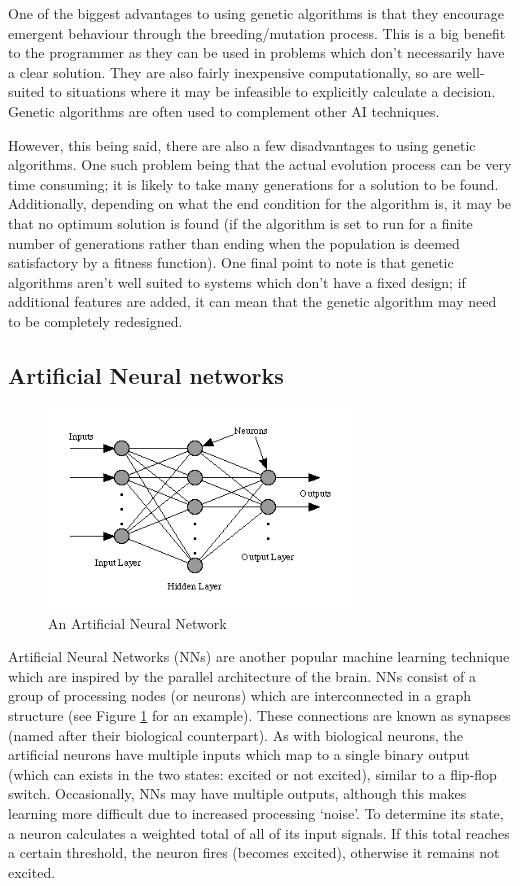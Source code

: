 \documentclass[a4paper,oneside]{report}
\begin{document}
One of the biggest advantages to using genetic algorithms is that they encourage emergent behaviour through the breeding/mutation process. This is a big benefit to the programmer as they can be used in problems which don't necessarily have a clear solution. They are also fairly inexpensive computationally, so are well-suited to situations where it may be infeasible to explicitly calculate a decision. Genetic algorithms are often used to complement other AI techniques.

However, this being said, there are also a few disadvantages to using genetic algorithms. One such problem being that the actual evolution process can be very time consuming; it is likely to take many generations for a solution to be found. Additionally, depending on what the end condition for the algorithm is, it may be that no optimum solution is found (if the algorithm is set to run for a finite number of generations rather than ending when the population is deemed satisfactory by a fitness function). One final point to note is that genetic algorithms aren't well suited to systems which don't have a fixed design; if additional features are added, it can mean that the genetic algorithm may need to be completely redesigned.

\subsection{Artificial Neural networks}

\begin{figure}
	\centering
		\includegraphics[width=80mm]{sources/images/NeuralNetwork}
    	\caption{An Artificial Neural Network \cite{Dawson:2000uq}}
    	\label{fig:NeuralNet}
\end{figure}

Artificial Neural Networks (NNs) are another popular machine learning technique which are inspired by the parallel architecture of the brain. NNs consist of a group of processing nodes (or neurons) which are interconnected in a graph structure (see Figure \ref{fig:NeuralNet} for an example). These connections are known as synapses (named after their biological counterpart). As with biological neurons, the artificial neurons have multiple inputs which map to a single binary output (which can exists in the two states: excited or not excited), similar to a flip-flop switch. Occasionally, NNs may have multiple outputs, although this makes learning more difficult due to increased  processing `noise'. To determine its state, a neuron calculates a weighted total of all of its input signals. If this total reaches a certain threshold, the neuron fires (becomes excited), otherwise it remains not excited. 
\end{document}

